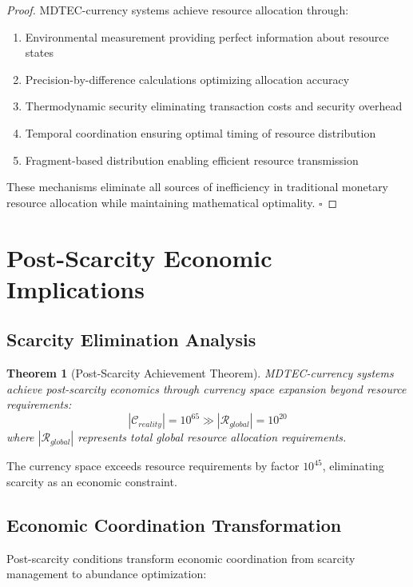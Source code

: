 \documentclass[12pt,a4paper]{article}
\newtheorem{theorem}{Theorem}
\begin{document}
\begin{proof}
MDTEC-currency systems achieve resource allocation through:
\begin{enumerate}
\item Environmental measurement providing perfect information about resource states
\item Precision-by-difference calculations optimizing allocation accuracy
\item Thermodynamic security eliminating transaction costs and security overhead
\item Temporal coordination ensuring optimal timing of resource distribution
\item Fragment-based distribution enabling efficient resource transmission
\end{enumerate}

These mechanisms eliminate all sources of inefficiency in traditional monetary resource allocation while maintaining mathematical optimality. $\square$
\end{proof}

\section{Post-Scarcity Economic Implications}

\subsection{Scarcity Elimination Analysis}

\begin{theorem}[Post-Scarcity Achievement Theorem]
MDTEC-currency systems achieve post-scarcity economics through currency space expansion beyond resource requirements:
\begin{equation}
|\mathcal{C}_{reality}| = 10^{65} \gg |\mathcal{R}_{global}| = 10^{20}
\end{equation}
where $|\mathcal{R}_{global}|$ represents total global resource allocation requirements.
\end{theorem}

The currency space exceeds resource requirements by factor $10^{45}$, eliminating scarcity as an economic constraint.

\subsection{Economic Coordination Transformation}

Post-scarcity conditions transform economic coordination from scarcity management to abundance optimization:
\end{document}

